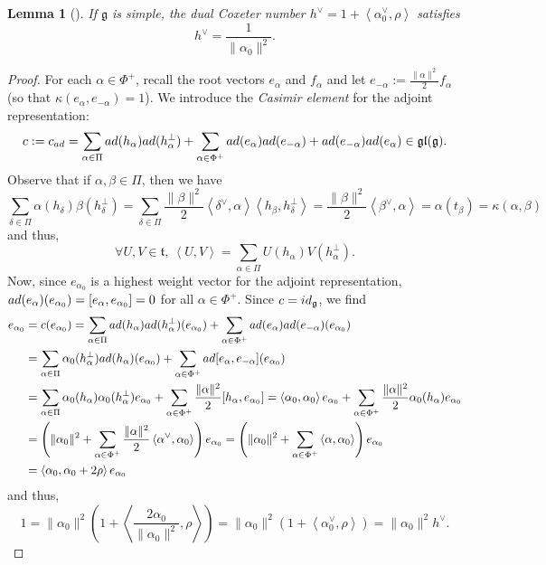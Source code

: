 \documentclass[11pt,twoside]{amsart}
\theoremstyle{plain}
\newtheorem{lem}[prop]{Lemma}
\begin{document}
\begin{lem}[{\cite[Lemma 4]{suter}}]\label{hvee}
If $\mathfrak{g}$ is simple, the dual Coxeter number $h^\vee=1+\left<\alpha_0^\vee,\rho\right>$ satisfies
\[h^\vee=\frac{1}{\|\alpha_0\|^2}.\] %
\end{lem}
\begin{proof} For each $\alpha\in\Phi^+$, recall the root vectors $e_\alpha$ and $f_\alpha$ and let $e_{-\alpha}:=\frac{\|\alpha\|^2}{2}f_\alpha$ (so that $\kappa(e_\alpha,e_{-\alpha})=1$). We introduce the \textit{Casimir element} for the adjoint representation: \[c:=c_{\rm ad}=\sum_{\alpha\in\Pi}{\rm ad}(h_\alpha){\rm ad}(h_\alpha^\perp)+\sum_{\alpha\in\Phi^+}{\rm ad}(e_\alpha){\rm ad}(e_{-\alpha})+{\rm ad}(e_{-\alpha}){\rm ad}(e_\alpha)\in\mathfrak{gl}(\mathfrak{g}).\] Observe that if $\alpha,\beta\in\Pi$, then we have
\[\sum_{\delta\in\Pi}\alpha(h_\delta)\beta(h_\delta^\perp)=\sum_{\delta\in\Pi}\frac{\|\beta\|^2}{2}\left<\delta^\vee,\alpha\right>\left<h_\beta,h_\delta^\perp\right>=\frac{\|\beta\|^2}{2}\left<\beta^\vee,\alpha\right>=\alpha(t_\beta)=\kappa(\alpha,\beta)\]
and thus, \[\forall U,V\in\mathfrak{t},~\left<U,V\right>=\sum_{\alpha\in\Pi}U(h_\alpha)V(h_\alpha^\perp).\] Now, since $e_{\alpha_0}$ is a highest weight vector for the adjoint representation, ${\rm ad}(e_\alpha)(e_{\alpha_0})=[e_\alpha,e_{\alpha_0}]=0$ for all $\alpha\in\Phi^+$. Since $c={\rm id}_{\mathfrak{g}}$, we find \begin{align*}
e_{\alpha_0}&=c(e_{\alpha_0})=\sum_{\alpha\in\Pi}{\rm ad}(h_\alpha){\rm ad}(h_\alpha^\perp)(e_{\alpha_0})+\sum_{\alpha\in\Phi^+}{\rm ad}(e_\alpha){\rm ad}(e_{-\alpha})(e_{\alpha_0}) \\
&=\sum_{\alpha\in\Pi}\alpha_0(h_\alpha^\perp){\rm ad}(h_\alpha)(e_{\alpha_0})+\sum_{\alpha\in\Phi^+}{\rm ad}[e_\alpha,e_{-\alpha}](e_{\alpha_0}) \\
&=\sum_{\alpha\in\Pi}\alpha_0(h_\alpha)\alpha_0(h_\alpha^\perp)e_{\alpha_0}+\sum_{\alpha\in\Phi^+}\frac{\|\alpha\|^2}{2}[h_\alpha,e_{\alpha_0}]=\left<\alpha_0,\alpha_0\right>e_{\alpha_0}+\sum_{\alpha\in\Phi^+}\frac{\|\alpha\|^2}{2}\alpha_0(h_\alpha)e_{\alpha_0} \\
&=\left(\|\alpha_0\|^2+\sum_{\alpha\in\Phi^+}\frac{\|\alpha\|^2}{2}\left<\alpha^\vee,\alpha_0\right>\right)e_{\alpha_0}=\left(\|\alpha_0\|^2+\sum_{\alpha\in\Phi^+}\left<\alpha,\alpha_0\right>\right)e_{\alpha_0} \\
&=\left<\alpha_0,\alpha_0+2\rho\right>e_{\alpha_0}
\end{align*} and thus, \[1=\|\alpha_0\|^2\left(1+\left<\frac{2\alpha_0}{\|\alpha_0\|^2},\rho\right>\right)=\|\alpha_0\|^2(1+\left<\alpha_0^\vee,\rho\right>)=\|\alpha_0\|^2h^\vee.\]
\end{proof}
\end{document}

